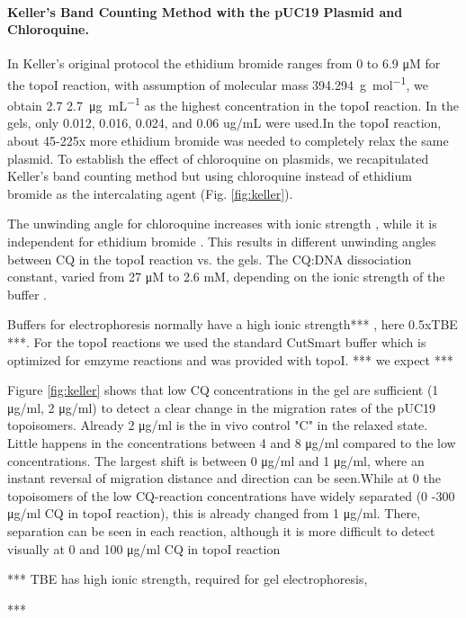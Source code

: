 \documentclass[10pt,letterpaper]{article}
\newcommand{\ugml}{\micro\gram\per\milli\liter}
\newcommand{\TODO}[1]{\begingroup\color{red}*** #1 ***\endgroup}
\begin{document}
\paragraph{Keller's Band Counting Method with the pUC19 Plasmid and Chloroquine.}

In Keller's original protocol \cite{Keller1975b} the ethidium bromide
ranges from 0 to 6.9 μM for the topoI reaction, with assumption of
molecular mass \SI{394.294}{\gram\per\mol}, we obtain 2.7
\SI{2.7}{\ugml} as the highest concentration in the topoI reaction. In
the gels, only 0.012, 0.016, 0.024, and 0.06 ug/mL were used.In the
topoI reaction, about 45-225x more ethidium bromide was needed to
completely relax the same plasmid. To establish the effect of
chloroquine on plasmids, we recapitulated Keller's band counting method
but using chloroquine instead of ethidium bromide as the
intercalating agent (Fig. \ref{fig:keller}).

The unwinding angle for chloroquine increases with ionic strength
\cite{Jones1980}, while it is independent for ethidium bromide
. This results in different unwinding angles between CQ
in the topoI reaction vs. the gels. The CQ:DNA
dissociation constant, varied from 27 μM to 2.6 mM, depending on the
ionic strength of the buffer \cite{KwakyeBerko1989}.


Buffers for electrophoresis normally
have a high ionic strength\TODO{, here 0.5xTBE}. For the topoI reactions we used
the standard CutSmart buffer which is optimized for emzyme reactions
and was provided with topoI. \TODO{we expect} 

Figure \ref{fig:keller} shows that low CQ concentrations in the gel
are sufficient (1 μg/ml, 2 μg/ml) to detect a clear change in the
migration rates of the pUC19 topoisomers. Already 2 μg/ml is the in
vivo control "C" in the relaxed state.  Little happens in the
concentrations between 4 and 8 μg/ml compared to the low
concentrations.  The largest shift is between 0 μg/ml and 1 μg/ml,
where an instant reversal of migration distance and direction can be
seen.While at 0 the topoisomers of the low CQ-reaction concentrations
have widely separated (0 -300 μg/ml CQ in topoI reaction), this is
already changed from 1 μg/ml.  There, separation can be seen in each
reaction, although it is more difficult to detect visually at 0 and
100 μg/ml CQ in topoI reaction

\TODO{
TBE has high ionic strength, required for gel electrophoresis,

}
\end{document}
